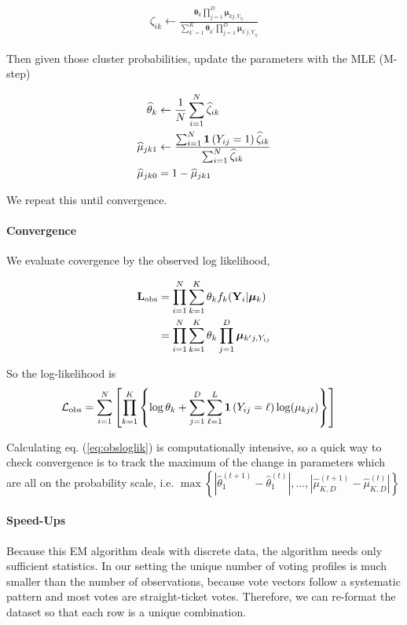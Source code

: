 \documentclass[11pt]{article}
\begin{document}
\begin{align}
\zeta_{ik} \leftarrow \frac{\bm{\theta}_{k}\prod^{D}_{j=1}\bm{\mu}_{kj,Y_{ij}}}
{\sum^{K}_{k^\prime=1}\bm{\theta}_{k^\prime}\prod^{D}_{j=1}\bm{\mu}_{k^\prime j,Y_{ij}}}
\end{align}

Then given those cluster probabilities, update the parameters with the MLE (M-step)

\begin{align}
\widehat{\theta}_{k} &\leftarrow \frac{1}{N}\sum^N_{i = 1}\widehat{\zeta}_{ik}\\
\widehat{\mu}_{jk1} &\leftarrow\frac{\sum^N_{i=1}\bm{1}\left(Y_{ij} = 1\right)\widehat{\zeta}_{ik}}{\sum^{N}_{i=1}\widehat{\zeta}_{ik}}\\
\widehat{\mu}_{jk0} &= 1 - \widehat{\mu}_{jk1}
\end{align}

We repeat this until convergence.

\paragraph{Convergence} We evaluate covergence by the observed log likelihood, 

\begin{align*}
\mathbf{L}_{\text{obs}} &= \prod^{N}_{i=1}\sum^K_{k=1}\theta_k f_{k}(\mathbf{Y}_{i} | \bm{\mu}_{k})\\
&= \prod^N_{i=1}\sum^{K}_{k=1}\theta_k \prod^{D}_{j=1}\bm{\mu}_{k^\prime j,Y_{ij}}
\end{align*}

So the log-likelihood is
\begin{align}
\mathcal{L}_{\text{obs}} &= \sum^{N}_{i=1}\left[\prod^{K}_{k=1}\left\{\log\theta_{k} + \sum^D_{j=1}\sum^L_{\ell=1}\bm{1}\left(Y_{ij} = \ell\right)\log(\mu_{kj\ell})\right\}\right]\label{eq:obsloglik}
\end{align}

Calculating eq. (\ref{eq:obsloglik}) is computationally intensive, so a quick way to check convergence is to track the maximum of the change in parameters which are all on the probability scale, i.e. \(\max\left\{|\widehat\theta^{(t + 1)}_{1} - \widehat\theta^{(t)}_{1}|, ..., |\widehat\mu^{(t + 1)}_{K,D} - \widehat\mu^{(t)}_{K,D}|\right\}\)

\paragraph{Speed-Ups} Because this EM algorithm deals with discrete data, the algorithm needs only sufficient statistics. In our setting the unique number of voting profiles is much smaller than the number of observations, because vote vectors follow a systematic pattern and most votes are straight-ticket votes. Therefore, we can re-format the dataset so that each row is a unique combination.
\end{document}
